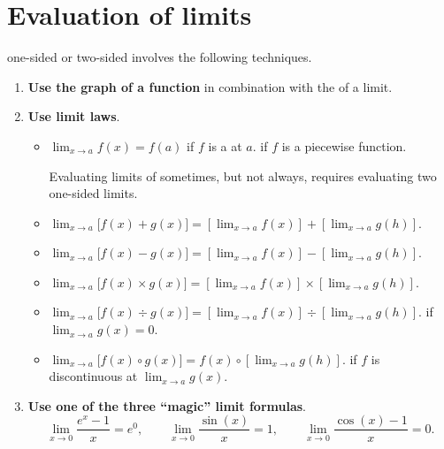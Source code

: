 \documentclass[../main.tex]{subfiles}
\begin{document}
 \section{Evaluation of limits}

 one-sided or two-sided  involves the following techniques.
\begin{enumerate}
  \item \textbf{Use the graph of a function} in combination with the  of a limit.

  \item \textbf{Use limit laws}.
    \begin{itemize}
      \item \(\lim_{x \to a} f(x) = f(a)\) if \(f\) is a  at \(a\).   if \(f\) is a piecewise function.

        Evaluating limits of  sometimes, but not always, requires evaluating two one-sided limits.

      \item \(\lim_{x \to a} \big[ f(x) + g(x) \big] = \left[ \lim_{x \to a} f(x) \right] + \left[ \lim_{x \to a} g(h) \right]\).

      \item \(\lim_{x \to a} \big[ f(x) - g(x) \big] = \left[ \lim_{x \to a} f(x) \right] - \left[ \lim_{x \to a} g(h) \right]\).

      \item \(\lim_{x \to a} \big[ f(x) \times g(x) \big] = \left[ \lim_{x \to a} f(x) \right] \times \left[ \lim_{x \to a} g(h) \right]\).

      \item \(\lim_{x \to a} \big[ f(x) \div g(x) \big] = \left[ \lim_{x \to a} f(x) \right] \div \left[ \lim_{x \to a} g(h) \right]\).  if \(\lim_{x \to a} g(x) = 0\).

      \item \(\lim_{x \to a} \big[ f(x) \circ g(x) \big] = f(x)  \circ \left[ \lim_{x \to a} g(h) \right]\).  if \(f\) is discontinuous at \(\lim_{x \to a} g(x)\).
    \end{itemize}

  \item \textbf{Use one of the three ``magic'' limit formulas}.
    \[
      \lim_{x \to 0} \frac{e^{x} - 1}{x} = e^{0},
      \qquad
      \lim_{x \to 0} \frac{\sin(x)}{x} = 1,
      \qquad
      \lim_{x \to 0} \frac{\cos(x) - 1}{x} = 0.
    \]


\end{enumerate}
\end{document}
